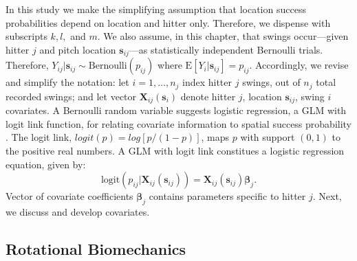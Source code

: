 In this study we make the simplifying assumption that location success probabilities depend on location and hitter only. Therefore, we dispense with subscripts $k, l,$ and $m$. We also assume, in this chapter, that swings occur---given hitter $j$ and pitch location $\pmb{s}_{ij}$---as statistically independent Bernoulli trials. Therefore, $Y_{ij}|\pmb{s}_{ij} \sim \text{Bernoulli}(p_{ij})$ where $\text{E}[Y_{i}|\pmb{s}_{ij}] = p_{ij}$. Accordingly, we revise and simplify the notation: let $i = 1, \dots, n_{j}$ index hitter $j$ swings, out of $n_{j}$ total recorded swings; and let vector $\pmb{X}_{ij}(\pmb{s}_{i})$ denote hitter $j$, location $\pmb{s}_{ij}$, swing $i$ covariates. A Bernoulli random variable suggests logistic regression, a GLM with logit link function, for relating covariate information to spatial success probability \citep{Myers2012}. The logit link, $logit(p) = log\left[p/(1-p)\right]$, maps $p$ with support $(0,1)$ to the positive real numbers. A GLM with logit link constitues a logistic regression equation, given by: 
\begin{equation}
\text{logit}(p_{ij}|\pmb{X}_{ij}(\pmb{s}_{ij})) = \pmb{X}_{ij}(\pmb{s}_{ij}) \pmb{\beta}_{j}.
\end{equation}
Vector of covariate coefficients $\pmb{\beta}_{j}$ contains parameters specific to hitter $j$. Next, we discuss and develop covariates.

\subsection{Rotational Biomechanics} %

